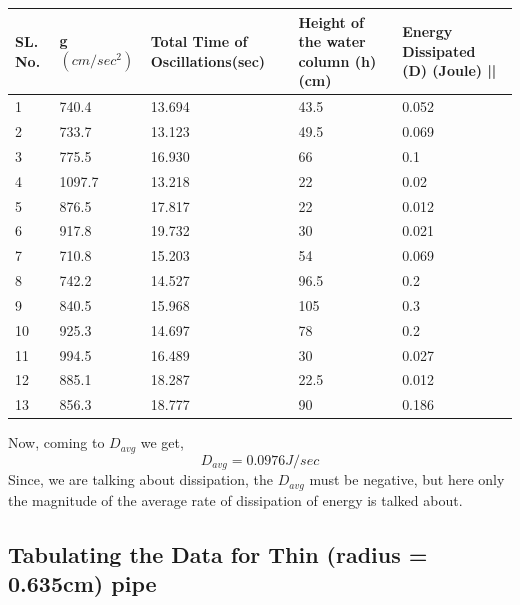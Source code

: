 \documentclass[twocolumn,11pt]{article}
\begin{document}
\begin{center}
\begin{tabular}{||p{0.5cm} | p{1cm}| p{1.5cm}| p{1.3cm} | p{2cm}||} 
 \hline
    SL. No. & g $(cm/sec^2)$ & Total Time of Oscillations(sec) & Height of the water column (h)(cm) & Energy Dissipated (D) (Joule) ||\\ [0.5ex] 
 \hline\hline
 1 & 740.4 & 13.694 & 43.5 & 0.052\\ 
 \hline
 2 & 733.7 & 13.123 & 49.5 & 0.069 \\
 \hline
 3 & 775.5 & 16.930 & 66 & 0.1\\
 \hline
 4 & 1097.7 & 13.218 & 22 & 0.02\\
 \hline
 5 & 876.5 & 17.817 & 22 & 0.012\\
 \hline
 6 & 917.8 & 19.732 & 30 & 0.021\\
 \hline
 7 & 710.8 & 15.203 & 54 & 0.069\\
 \hline
 8 & 742.2 & 14.527 & 96.5 & 0.2\\
 \hline
 9 & 840.5 & 15.968 & 105 & 0.3\\
 \hline
 10  & 925.3 & 14.697 & 78 & 0.2\\
 \hline
 11 & 994.5 & 16.489 & 30 & 0.027\\
 \hline
 12 & 885.1 & 18.287 & 22.5 & 0.012\\
 \hline
 13 & 856.3 & 18.777 & 90 & 0.186\\
 \hline
 \hline
\end{tabular}
\end{center}

Now, coming to $D_{avg}$ we get,
\begin{equation}
    \label{avg. rate of energy diddipation for thick tube}
    D_{avg} = 0.0976 J/sec
\end{equation}
Since, we are talking about dissipation, the $D_{avg}$ must be negative, but here only the magnitude of the average rate of dissipation of energy is talked about. 

\subsection{Tabulating the Data for Thin (radius = 0.635cm) pipe}
\end{document}
